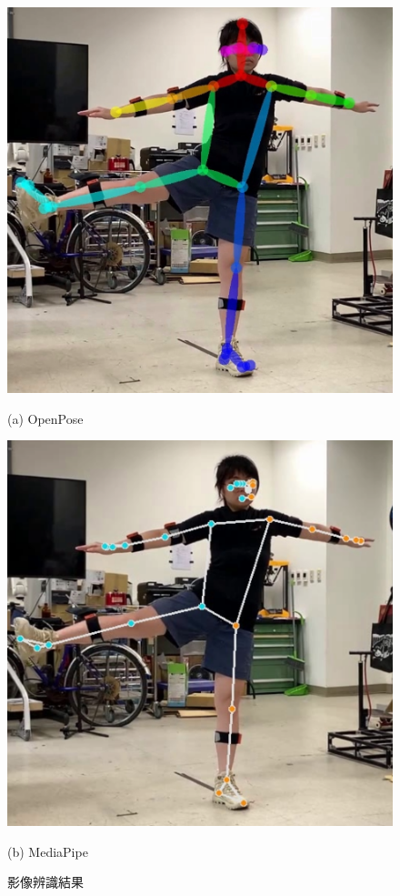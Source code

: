 \begin{figure}[!ht]
    \centering
    \begin{minipage}{.5\textwidth}
      \centering
      \includegraphics[width=.95\linewidth]{figure/ch2_fig_rec_openpose.png}
      \caption*{(a) OpenPose}
    \end{minipage}%
    \begin{minipage}{.5\textwidth}
       \centering
       \includegraphics[width=.95\linewidth]{figure/ch2_fig_rec_mediapipe.png}
       \caption*{(b) MediaPipe}
    \end{minipage}
    \caption[影像辨識結果]{影像辨識結果}
    \label{ch2_fig_rec_result}
\end{figure}

